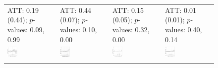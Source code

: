 \documentclass[12pt]{article}
\begin{document}
\begin{figure}[!th]
\begin{minipage}{1\linewidth}
{{\begin{tabular}{C{3.8cm}C{3.8cm}C{3.8cm}C{3.8cm}}
    \citet{Clayton2018} \newline  ATT: 0.19 (0.44); \newline $p$-values: 0.09, 0.99 &
   \citet{cox2021budgetary} \newline  ATT: 0.44 (0.07); \newline $p$-values: 0.10, 0.00 &
   \citet{Distelhorst2018} \newline ATT: 0.15 (0.05); \newline $p$-values: 0.32, 0.00 & 
   \citet{eckhouse2022metrics} \newline ATT: 0.01 (0.01); \newline $p$-values: 0.40, 0.14 \\
   \hspace{-2em}\includegraphics[width = 0.22\textwidth]{figure/fect/clayton_fect_entry.png} &
   \hspace{-2em} \includegraphics[width = 0.22\textwidth]{figure/fect/Cox_fect_entry.png} &
   \hspace{-2em}\includegraphics[width = 0.22\textwidth]{figure/fect/distelhorst_fect_entry} &
    \hspace{-2em} \includegraphics[width = 0.22\textwidth]{figure/fect/eckhouse_fect_entry.png}\\ \\ 

\end{tabular}}}
\end{minipage}
\end{figure}
\end{document}
